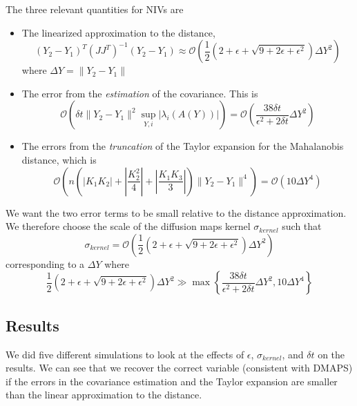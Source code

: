 \documentclass[12pt]{article}
\begin{document}
The three relevant quantities for NIVs are 
\begin{itemize}
\item The linearized approximation to the distance,
%
\begin{equation}
(Y_2 - Y_1)^T (JJ^T)^{-1} (Y_2 - Y_1) 
\approx \mathcal{O} \left(  \frac{1}{2} \left( 2 + \epsilon + \sqrt{ 9 + 2 \epsilon + \epsilon^2}\right) \Delta Y^2\right) 
\end{equation}
where $\Delta Y =  \|Y_2 - Y_1\|$

\item The error from the {\em estimation} of the covariance.
%
This is
\begin{equation}
\mathcal{O} \left( \delta t \| Y_2 - Y_1 \|^2 \sup_{Y, i} |\lambda_i(A(Y))| \right) 
= \mathcal{O} \left( \frac{38 \delta t}{\epsilon ^2 + 2 \delta t}\Delta Y^2 \right)
\end{equation}

\item The errors from the {\em truncation} of the Taylor expansion for the Mahalanobis distance, which is 
\begin{equation}
\mathcal{O} \left(  n \left( \left| K_1 K_2 \right| + \left| \frac{ K_2^2}{4} \right|  + \left| \frac{K_1 K_3}{3} \right|  \right) \| Y_2 - Y_1 \| ^4  \right)
= \mathcal{O} \left( 10 \Delta Y^4  \right) 
\end{equation}

\end{itemize}

We want the two error terms to be small relative to the distance approximation. 
%
We therefore choose the scale of the diffusion maps kernel $\sigma_{kernel}$ such that
\begin{equation}
\sigma_{kernel} = \mathcal{O} \left(  \frac{1}{2} \left( 2 + \epsilon + \sqrt{ 9 + 2 \epsilon + \epsilon^2}\right) \Delta Y^2\right)
\end{equation}
%
corresponding to a $\Delta Y$ where
\begin{equation}
  \frac{1}{2} \left( 2 + \epsilon + \sqrt{ 9 + 2 \epsilon + \epsilon^2}\right) \Delta Y^2  
\gg 
\max \left\{  
\frac{38 \delta t}{\epsilon ^2 + 2 \delta t} \Delta Y^2, 
10 \Delta Y^4
 \right\}
\end{equation}

\subsection{Results}

We did five different simulations to look at the effects of $\epsilon$, $\sigma_{kernel}$, and $\delta t$ on the results.
%
We can see that we recover the correct variable (consistent with DMAPS) if the errors in the covariance estimation and the Taylor expansion are smaller than the linear approximation to the distance. 
\end{document}
